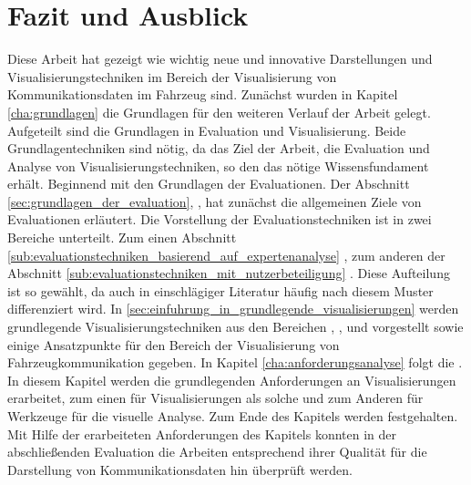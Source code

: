 \documentclass[draft=false
              ,paper=a4
              ,twoside=false
              ,fontsize=11pt
              ,headsepline
              ,BCOR10mm
              ,DIV11
              ]{scrbook}
\begin{document}
\chapter{Fazit und Ausblick} %
\label{cha:fazit_und_ausblick}
Diese Arbeit hat gezeigt wie wichtig neue und innovative Darstellungen und Visualisierungstechniken im Bereich der Visualisierung von Kommunikationsdaten im Fahrzeug sind. Zunächst wurden in Kapitel \ref{cha:grundlagen} die Grundlagen für den weiteren Verlauf der Arbeit gelegt. Aufgeteilt sind die Grundlagen in Evaluation und Visualisierung. Beide Grundlagentechniken sind nötig, da das Ziel der Arbeit, die Evaluation und Analyse von Visualisierungstechniken, so den das nötige Wissensfundament erhält. Beginnend mit den Grundlagen der Evaluationen. Der Abschnitt \ref{sec:grundlagen_der_evaluation}, , hat zunächst die allgemeinen Ziele von Evaluationen erläutert. Die Vorstellung der Evaluationstechniken ist in zwei Bereiche unterteilt. Zum einen Abschnitt \ref{sub:evaluationstechniken_basierend_auf_expertenanalyse} , zum anderen der Abschnitt \ref{sub:evaluationstechniken_mit_nutzerbeteiligung} . Diese Aufteilung ist so gewählt, da auch in einschlägiger Literatur häufig nach diesem Muster differenziert wird. In \ref{sec:einfuhrung_in_grundlegende_visualisierungen}  werden grundlegende Visualisierungstechniken aus den Bereichen , ,  und  vorgestellt sowie einige Ansatzpunkte für den Bereich der Visualisierung von Fahrzeugkommunikation gegeben. 
In Kapitel \ref{cha:anforderungsanalyse} folgt die . In diesem Kapitel werden die grundlegenden Anforderungen an Visualisierungen erarbeitet, zum einen für Visualisierungen als solche und zum Anderen für Werkzeuge für die visuelle Analyse. Zum Ende des Kapitels werden  
festgehalten. Mit Hilfe der erarbeiteten Anforderungen des Kapitels konnten in der abschließenden Evaluation die Arbeiten entsprechend ihrer Qualität für die Darstellung von Kommunikationsdaten hin überprüft werden.
\end{document}

